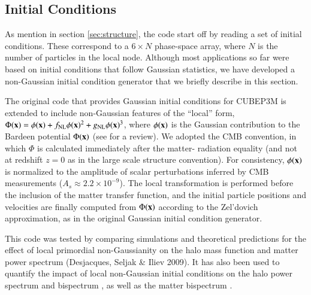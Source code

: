 \subsection{Initial Conditions}
\label{subsec:init}

As mention in section \ref{sec:structure}, the code start off by reading a set of initial conditions.
These correspond to a  $6 \times N$ phase-space array, where $N$ is the number of particles in the
local node. Although most applications so far were based on initial conditions that follow Gaussian statistics,
we have developed a non-Gaussian initial condition generator that we briefly describe in this section. 


The original code that provides Gaussian initial conditions for {\small CUBEP3M} 
is extended to include non-Gaussian features of the ``local'' form,
$\Phi({\bf x})=\phi({\bf x})+f_{\rm NL} \phi({\bf x})^2 + g_{\rm NL} 
\phi({\bf x})^3$, where $\phi({\bf x})$ is the Gaussian contribution
to the Bardeen potential $\Phi({\bf x})$ (see \cite{Bartolo_2004} for a review). 
We adopted the CMB convention,
in which $\Phi$ is calculated immediately after the matter-
radiation equality (and not at redshift $z=0$ as in the large scale
structure convention). For consistency, $\phi({\bf x})$ is normalized
to the amplitude of scalar perturbations inferred by CMB measurements
($A_s\approx 2.2 \times 10^{-9}$). The local transformation is performed 
before the inclusion of the matter transfer function, and the initial 
particle positions and velocities are finally computed from $\Phi({\bf x})$ 
according to the Zel'dovich approximation, as in the original Gaussian initial condition generator.

This code was tested by comparing simulations and theoretical predictions
for the effect of local primordial non-Gaussianity on the halo mass 
function and matter power spectrum (Desjacques, Seljak \& Iliev 2009). 
It has also been used to quantify the impact of local non-Gaussian initial
conditions on the halo power spectrum \citep{2009MNRAS.396...85D,
2010PhRvD..81b3006D} and bispectrum \citep{2010MNRAS.406.1014S},
 as well as the matter bispectrum \citep{2011arXiv1111.6966S}.

